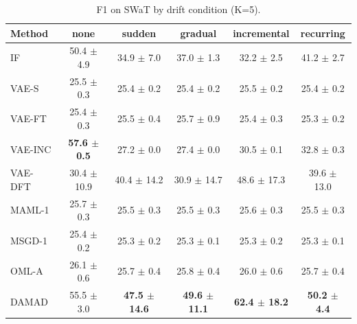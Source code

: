 \begin{table}[t]
\centering
\small
\caption{F1 on SWaT by drift condition (K=5).}
\label{tab:drift_f1_swat}
\begin{tabular}{lccccc}
\toprule
Method & none & sudden & gradual & incremental & recurring \\
\midrule
IF & 50.4 $\pm$ 4.9 & 34.9 $\pm$ 7.0 & 37.0 $\pm$ 1.3 & 32.2 $\pm$ 2.5 & 41.2 $\pm$ 2.7 \\
VAE-S & 25.5 $\pm$ 0.3 & 25.4 $\pm$ 0.2 & 25.4 $\pm$ 0.2 & 25.5 $\pm$ 0.2 & 25.4 $\pm$ 0.2 \\
VAE-FT & 25.4 $\pm$ 0.3 & 25.5 $\pm$ 0.4 & 25.7 $\pm$ 0.9 & 25.4 $\pm$ 0.3 & 25.3 $\pm$ 0.2 \\
VAE-INC & \textbf{57.6 $\pm$ 0.5} & 27.2 $\pm$ 0.0 & 27.4 $\pm$ 0.0 & 30.5 $\pm$ 0.1 & 32.8 $\pm$ 0.3 \\
VAE-DFT & 30.4 $\pm$ 10.9 & 40.4 $\pm$ 14.2 & 30.9 $\pm$ 14.7 & 48.6 $\pm$ 17.3 & 39.6 $\pm$ 13.0 \\
MAML-1 & 25.7 $\pm$ 0.3 & 25.5 $\pm$ 0.3 & 25.5 $\pm$ 0.3 & 25.6 $\pm$ 0.3 & 25.5 $\pm$ 0.3 \\
MSGD-1 & 25.4 $\pm$ 0.2 & 25.3 $\pm$ 0.2 & 25.3 $\pm$ 0.1 & 25.3 $\pm$ 0.2 & 25.3 $\pm$ 0.1 \\
OML-A & 26.1 $\pm$ 0.6 & 25.7 $\pm$ 0.4 & 25.8 $\pm$ 0.4 & 26.0 $\pm$ 0.6 & 25.7 $\pm$ 0.4 \\
DAMAD & 55.5 $\pm$ 3.0 & \textbf{47.5 $\pm$ 14.6} & \textbf{49.6 $\pm$ 11.1} & \textbf{62.4 $\pm$ 18.2} & \textbf{50.2 $\pm$ 4.4} \\
\bottomrule
\end{tabular}
\end{table}

